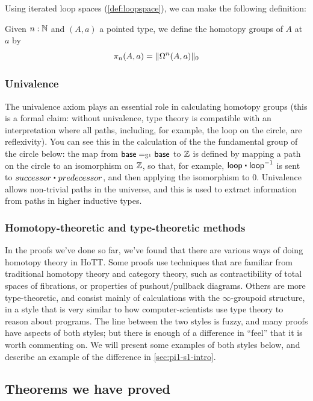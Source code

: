 Using iterated loop spaces (\cref{def:loopspace}), we can make the
following definition:
\begin{defn}
  Given $n:\N$ and $(A,a)$ a pointed type, we define the homotopy groups of $A$
  at $a$ by
  \[\pi_n(A,a)=\trunc0{\Omega^n(A,a)}\]
\end{defn}

\subsubsection{Univalence}  The univalence axiom plays an essential role in
  calculating homotopy groups (this is a formal claim: without
  univalence, type theory is compatible with an interpretation where all
  paths, including, for example, the loop on the circle, are reflexivity).  You
  can see this in the calculation of the the fundamental group of the
  circle below: the map from $\id[\Sn ^1] \base \base$ to $\Z$
  is defined by mapping a path on the circle to an isomorphism on
  $\Z$, so that, for example, $\lloop \ct \opp \lloop$ is sent
  to $successor \ct predecessor$, and then applying the isomorphism to
  0. Univalence allows non-trivial paths in the universe, and this is
  used to extract information from paths in higher inductive types.

\subsubsection{Homotopy-theoretic and type-theoretic methods}  In the
proofs we've done so far, we've found that there are various ways of
doing homotopy theory in HoTT.  Some proofs use techniques that are
familiar from traditional homotopy theory and category theory, such as
contractibility of total spaces of fibrations, or properties of
pushout/pullback diagrams.  Others are more type-theoretic, and consist
mainly of calculations with the $\infty$-groupoid structure, in a style
that is very similar to how computer-scientists use type theory to
reason about programs.  The line between the two styles is fuzzy, and
many proofs have aspects of both styles; but there is enough of a
difference in ``feel'' that it is worth commenting on.  We will present
some examples of both styles below, and describe an example of the
difference in \autoref{sec:pi1-s1-intro}.

\subsection{Theorems we have proved}

